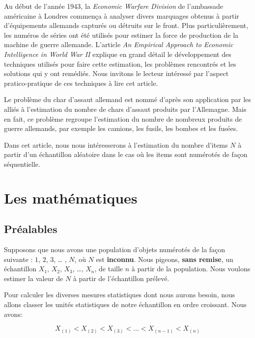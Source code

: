 \documentclass[10pt]{article}
\begin{document}
Au début de l'année 1943, la \emph{Economic Warfare Division} de
l'ambassade américaine à Londres commença à analyser divers marquages
obtenus à partir d'équipements allemands capturés ou détruits sur le
front. Plus particulièrement, les numéros de séries ont été utilisés
pour estimer la force de production de la machine de guerre allemande.
L'article \emph{An Empirical Approach to Economic Intelligence in World
War II} \cite{Ruggles1947} explique en grand détail le développement des
techniques utilisés pour faire cette estimation, les problèmes
rencontrés et les solutions qui y ont remédiés. Nous invitons le lecteur
intéressé par l'aspect pratico-pratique de ces techniques à lire cet
article.

Le problème du char d'assaut allemand est nommé d'après son application
par les alliés à l'estimation du nombre de chars d'assaut produits par
l'Allemagne. Mais en fait, ce problème regroupe l'estimation du nombre
de nombreux produits de guerre allemands, par exemple les camions, les
fusils, les bombes et les fusées.

Dans cet article, nous nous intéresserons à l'estimation du nombre
d'items \(N\) à partir d'un échantillon aléatoire dans le cas où les
items sont numérotés de façon séquentielle.

\section{\texorpdfstring{Les mathématiques
\label{maths}}{Les mathématiques }}\label{les-mathematiques}

\subsection{Préalables}\label{prealables}

Supposons que nous avons une population d'objets numérotés de la façon
suivante : \(1\), \(2\), \(3\), \ldots{} , \(N\), où \(N\) est
\textbf{inconnu}. Nous pigeons, \textbf{\textbf{sans remise}}, un
échantillon \(X_1\), \(X_2\), \(X_3\), \ldots{}, \(X_n\), de taille
\(n\) à partir de la population. Nous voulons estimer la valeur de \(N\)
à partir de l'échantillon prélevé.

Pour calculer les diverses mesures statistiques dont nous aurons besoin,
nous allons classer les unités statistiques de notre échantillon en
ordre croissant. Nous avons:

\[X_{(1)} <  X_{(2)} < X_{(3)} < \ldots < X_{(n-1)} < X_{(n)}\]
\end{document}
